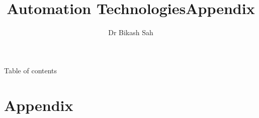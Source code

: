 \documentclass{../course_template/lectureClass}
\title[Automation Technologies]{Automation Technologies}
\author{Dr Bikash Sah}
\date{}
\begin{document}

\begin{frame}[plain]
    \titlepage
\end{frame}

\begin{frame}{Table of contents}
    \tableofcontents[hideallsubsections]
\end{frame}





\title[Appendix]{Appendix}
\section{Appendix} %
\end{document}
